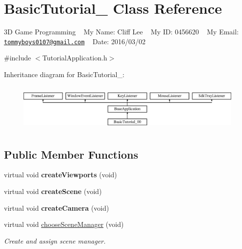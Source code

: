 \hypertarget{class_basic_tutorial__00}{}\section{Basic\+Tutorial\+\_ Class Reference}
\label{class_basic_tutorial__00}


3D Game Programming ~\newline
My Name\+: Cliff Lee ~\newline
My ID\+: 0456620 ~\newline
My Email\+: \href{mailto:tommyboys0107@gmail.com}{\tt tommyboys0107@gmail.\+com} ~\newline
 Date\+: 2016/03/02  




{\ttfamily \#include $<$Tutorial\+Application.\+h$>$}

Inheritance diagram for Basic\+Tutorial\+\_\+:\begin{figure}[H]
\begin{center}
\leavevmode
\includegraphics[height=2.382979cm]{class_basic_tutorial__00}
\end{center}
\end{figure}
\subsection*{Public Member Functions}
\begin{DoxyCompactItemize}
\item 
virtual void {\bfseries create\+Viewports} (void)\hypertarget{class_basic_tutorial__00_adc2454d9f8226e0958ecf702f355846e}{}\label{class_basic_tutorial__00_adc2454d9f8226e0958ecf702f355846e}

\item 
virtual void {\bfseries create\+Scene} (void)\hypertarget{class_basic_tutorial__00_a15a3d4673724ec99077ce992f996a550}{}\label{class_basic_tutorial__00_a15a3d4673724ec99077ce992f996a550}

\item 
virtual void {\bfseries create\+Camera} (void)\hypertarget{class_basic_tutorial__00_a1bf709417d654dffc2ea10987412b912}{}\label{class_basic_tutorial__00_a1bf709417d654dffc2ea10987412b912}

\item 
virtual void \hyperlink{class_basic_tutorial__00_aba97a29d983586d2dc8e108d3bccf721}{choose\+Scene\+Manager} (void)\hypertarget{class_basic_tutorial__00_aba97a29d983586d2dc8e108d3bccf721}{}\label{class_basic_tutorial__00_aba97a29d983586d2dc8e108d3bccf721}

\begin{DoxyCompactList}\small\item\em Create and assign scene manager. \end{DoxyCompactList}\end{DoxyCompactItemize}
